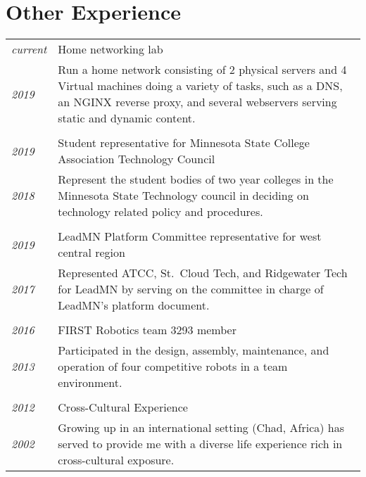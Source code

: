 \documentclass[letterpaper,10pt]{article}
\begin{document}
\section*{Other Experience}
	\begin{tabular}{R{2cm}|p{14cm}}
	\textsl{current} & Home networking lab\\
	\textsl{2019} & Run a home network consisting of 2 physical servers and 4 Virtual machines doing a variety of tasks, such as a DNS, an NGINX reverse proxy, and several webservers serving static and dynamic content.\\
	\\
	\textsl{2019} & Student representative for Minnesota State College Association Technology Council\\
	\textsl{2018} & Represent the student bodies of two year colleges in the Minnesota State Technology council in deciding on technology related policy and procedures.\\
	\\
	\textsl{2019} & LeadMN Platform Committee representative for west central region\\
	\textsl{2017} & Represented ATCC, St.\ Cloud Tech, and Ridgewater Tech for LeadMN by serving on the committee in charge of LeadMN's platform document.\\
	\\
	\textsl{2016} & FIRST Robotics team 3293 member\\
	\textsl{2013} & Participated in the design, assembly, maintenance, and operation of four competitive robots in a team environment.\\
	\\
	\textsl{2012} & Cross-Cultural Experience\\
	\textsl{2002} &Growing up in an international setting (Chad, Africa) has served to provide me with a diverse life experience rich in cross-cultural exposure.\\
	\end{tabular}
\end{document}
